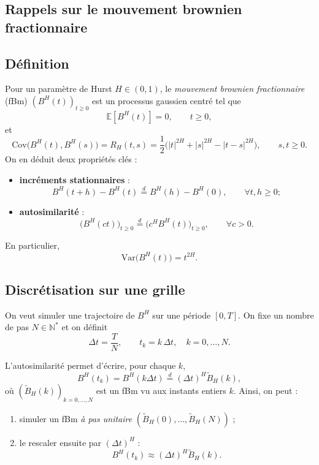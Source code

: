 \documentclass[11pt,a4paper]{article}
\newcommand{\E}{\mathbb{E}}
\newcommand{\Var}{\mathrm{Var}}
\newcommand{\Cov}{\mathrm{Cov}}
\newcommand{\1}{\mathbf{1}}
\newcommand{\bH}{B^{H}}
\begin{document}
\subsection{Rappels sur le mouvement brownien fractionnaire}

\subsection{Définition}

Pour un paramètre de Hurst $H\in(0,1)$, le \emph{mouvement brownien fractionnaire}
(fBm) $(\bH(t))_{t\ge 0}$ est un processus gaussien centré tel que
\begin{equation}
  \E[\bH(t)] = 0,\qquad t\ge 0,
\end{equation}
et
\begin{equation}
  \Cov\bigl(\bH(t),\bH(s)\bigr)
  = R_H(t,s)
  = \frac{1}{2}\bigl(|t|^{2H} + |s|^{2H} - |t-s|^{2H}\bigr),
  \qquad s,t\ge 0.
\end{equation}
On en déduit deux propriétés clés :
\begin{itemize}
  \item \textbf{incréments stationnaires} :
  \[
    \bH(t+h)-\bH(t)
    \stackrel{d}{=}
    \bH(h)-\bH(0), \qquad \forall t,h\ge 0 ;
  \]
  \item \textbf{autosimilarité} :
  \[
    \bigl(\bH(ct)\bigr)_{t\ge 0}
    \stackrel{d}{=}
    \bigl(c^H \bH(t)\bigr)_{t\ge 0},\qquad \forall c>0.
  \]
\end{itemize}
En particulier,
\begin{equation}
  \Var\bigl(\bH(t)\bigr) = t^{2H}.
\end{equation}

\subsection{Discrétisation sur une grille}

On veut simuler une trajectoire de $\bH$ sur une période $[0,T]$.
On fixe un nombre de pas $N\in\mathbb{N}^\ast$ et on définit
\begin{equation}
  \Delta t = \frac{T}{N},\qquad
  t_k = k\,\Delta t,\quad k = 0,\dots,N.
\end{equation}

L'autosimilarité permet d'écrire, pour chaque $k$,
\begin{equation}
  \bH(t_k)
  = \bH(k\Delta t)
  \stackrel{d}{=} (\Delta t)^H \widetilde B_H(k),
\end{equation}
où $(\widetilde B_H(k))_{k=0,\dots,N}$ est un fBm vu aux instants entiers $k$.
Ainsi, on peut :
\begin{enumerate}
  \item simuler un fBm \emph{à pas unitaire} $(\widetilde B_H(0),\dots,\widetilde B_H(N))$ ;
  \item le rescaler ensuite par $(\Delta t)^H$ :
  \[
    \bH(t_k) \approx (\Delta t)^H \widetilde B_H(k).
  \]
\end{enumerate}
\end{document}
